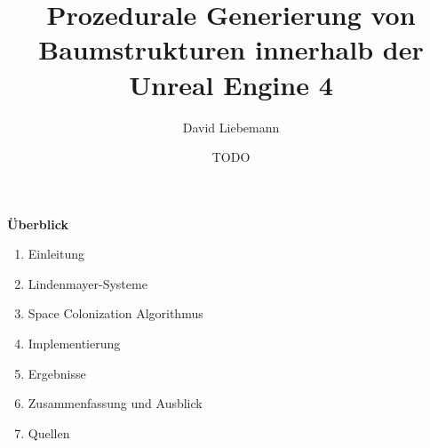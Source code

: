 \documentclass[20pt,landscape]{extarticle}
\title{Prozedurale Generierung von Baumstrukturen innerhalb der Unreal Engine 4}
\author{David Liebemann}
\date{TODO}
\begin{document}
\mytitlepage

\newpage
\noindent
{\Large \textbf{Überblick}} 
\slidetitle{}
\begin{enumerate}
	\item Einleitung 
	\item Lindenmayer-Systeme
	\item Space Colonization Algorithmus
	\item Implementierung
	\item Ergebnisse
	\item Zusammenfassung und Ausblick
	\item Quellen
\end{enumerate}











\end{document}
